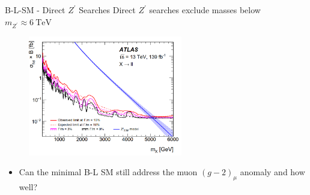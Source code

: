\documentclass[10pt,xcolor=dvipsnames,mathserif]{beamer}
\begin{document}
\begin{frame}{B-L-SM - Direct $Z^\prime$ Searches}
	Direct $Z^\prime$ searches exclude masses below $m_{Z^\prime} \approx 6~\mathrm{TeV}$ 
		\begin{figure}[!h]
			\includegraphics[width=0.6\textwidth]{Atlas_BLSM_2.png}
		\end{figure}	
		
\begin{itemize}
	\item Can the minimal B-L SM still address the muon $\left(g-2\right)_\mu$ anomaly and how well? 
\end{itemize}		
		
\end{frame}
\end{document}
